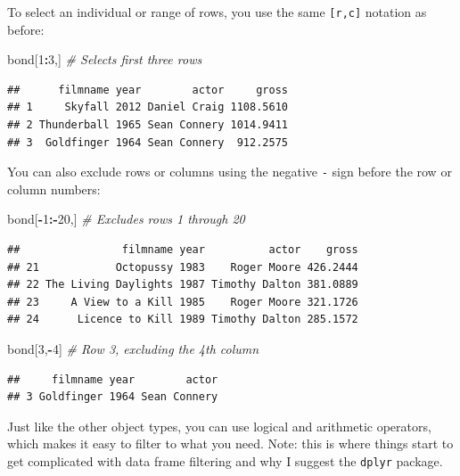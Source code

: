 \documentclass[
]{book}
\newenvironment{Shaded}{\begin{snugshade}}{\end{snugshade}}
\newcommand{\CommentTok}[1]{\textcolor[rgb]{0.56,0.35,0.01}{\textit{#1}}}
\newcommand{\DecValTok}[1]{\textcolor[rgb]{0.00,0.00,0.81}{#1}}
\newcommand{\NormalTok}[1]{#1}
\newcommand{\OperatorTok}[1]{\textcolor[rgb]{0.81,0.36,0.00}{\textbf{#1}}}
\begin{document}
\begin{center}
To select an individual or range of rows, you use the same \texttt{{[}r,c{]}} notation as before:

\begin{Shaded}
\begin{Highlighting}[]
\NormalTok{bond[}\DecValTok{1}\OperatorTok{:}\DecValTok{3}\NormalTok{,] }\CommentTok{# Selects first three rows}
\end{Highlighting}
\end{Shaded}

\begin{verbatim}
##      filmname year        actor     gross
## 1     Skyfall 2012 Daniel Craig 1108.5610
## 2 Thunderball 1965 Sean Connery 1014.9411
## 3  Goldfinger 1964 Sean Connery  912.2575
\end{verbatim}

You can also exclude rows or columns using the negative \texttt{-} sign before the row or column numbers:

\begin{Shaded}
\begin{Highlighting}[]
\NormalTok{bond[}\OperatorTok{-}\DecValTok{1}\OperatorTok{:-}\DecValTok{20}\NormalTok{,] }\CommentTok{# Excludes rows 1 through 20}
\end{Highlighting}
\end{Shaded}

\begin{verbatim}
##                filmname year          actor    gross
## 21            Octopussy 1983    Roger Moore 426.2444
## 22 The Living Daylights 1987 Timothy Dalton 381.0889
## 23     A View to a Kill 1985    Roger Moore 321.1726
## 24      Licence to Kill 1989 Timothy Dalton 285.1572
\end{verbatim}

\begin{Shaded}
\begin{Highlighting}[]
\NormalTok{bond[}\DecValTok{3}\NormalTok{,}\OperatorTok{-}\DecValTok{4}\NormalTok{] }\CommentTok{# Row 3, excluding the 4th column}
\end{Highlighting}
\end{Shaded}

\begin{verbatim}
##     filmname year        actor
## 3 Goldfinger 1964 Sean Connery
\end{verbatim}

Just like the other object types, you can use logical and arithmetic operators, which makes it easy to filter to what you need. Note: this is where things start to get complicated with data frame filtering and why I suggest the \texttt{dplyr} package.


\end{center}
\end{document}
